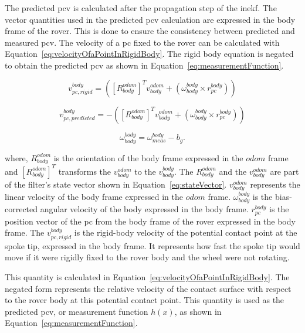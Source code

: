 \documentclass[report.tex]{subfiles}
\begin{document}
    The predicted \gls{pcv} is calculated after the propagation step of the \gls{inekf}. The vector quantities used in the predicted \gls{pcv} calculation are expressed in the body frame of the rover. This is done to ensure the consistency between predicted and measured \gls{pcv}. The velocity of a \gls{pc} fixed to the rover can be calculated with Equation~\ref{eq:velocityOfaPointInRigidBody}. The rigid body equation is negated to obtain the predicted \gls{pcv} as shown in Equation~\ref{eq:measurementFunction}.
        
    \begin{equation}
        v_{pc,rigid}^{body} = ([R_{body}^{odom}]^T  v_{body}^{odom} + (\omega_{body}^{body} \times r_{pc}^{body}))
        \label{eq:velocityOfaPointInRigidBody}
    \end{equation}
    
    \begin{equation}
        v_{pc, predicted}^{body} = -([R_{body}^{odom}]^T  v_{body}^{odom} + (\omega_{body}^{body} \times r_{pc}^{body}))
        \label{eq:measurementFunction}
    \end{equation}
    
    \begin{equation}
        \omega_{body}^{body}
        =
        \omega_{meas}^{body}
        -
        b_g.
        \label{eq:gyroBiasRemoved}
    \end{equation}
    
    where, $R_{body}^{odom}$ is the orientation of the body frame expressed in the $odom$ frame and $[R_{body}^{odom}]^T$ transforms the $v_{body}^{odom}$ to the $v_{body}^{body}$. The $R_{body}^{odom}$ and the $v_{body}^{odom}$ are part of the filter's state vector shown in Equation~\ref{eq:stateVector}. $v_{body}^{odom}$ represents the linear velocity of the body frame expressed in the $odom$ frame. $\omega_{body}^{body}$ is the bias-corrected angular velocity of the body expressed in the body frame. $r_{pc}^{body}$ is the position vector of the \gls{pc} from the body frame of the rover expressed in the body frame. The $v_{pc, rigid}^{body}$ is the rigid-body velocity of the potential contact point at the spoke tip, expressed in the body frame. It represents how fast the spoke tip would move if it were rigidly fixed to the rover body and the wheel were not rotating.
    
    This quantity is calculated in Equation~\ref{eq:velocityOfaPointInRigidBody}. The negated form represents the relative velocity of the contact surface with respect to the rover body at this potential contact point. This quantity is used as the predicted \gls{pcv}, or measurement function $h(x)$, as shown in Equation~\ref{eq:measurementFunction}.
\end{document}
